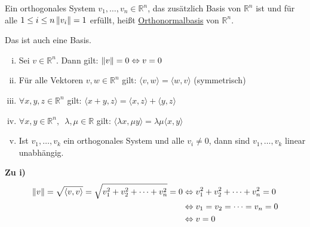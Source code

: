 Ein orthogonales System $v_1,\dots,v_n \in \mathbb{R}^n$, das zusätzlich Basis von $\mathbb{R}^n$ ist und für alle $1\leq i\leq n \left\lVert v_i\right\rVert = 1$ erfüllt, heißt \underline{Orthonormalbasis} von $\mathbb{R}^n$.

\begin{center}
\end{center}
Das ist auch eine Basis.

\begin{enumerate}[i)]
  \item{Sei $v \in \mathbb{R}^n$. Dann gilt: $\left\lVert v\right\rVert = 0 \Leftrightarrow v = 0$}
  \item{Für alle Vektoren $v, w \in \mathbb{R}^n$ gilt: $\langle v, w\rangle = \langle w, v\rangle$ (\glqq{}symmetrisch\grqq{})}
  \item{$\forall x, y, z \in \mathbb{R}^n$ gilt: $\langle x+y, z\rangle = \langle x, z\rangle + \langle y, z\rangle$}
  \item{$\forall x, y \in \mathbb{R}^n,\enspace \lambda, \mu \in \mathbb{R}$ gilt: $\langle\lambda x, \mu y\rangle = \lambda\mu\langle x, y\rangle$}
  \item{Ist $v_1,\dots,v_k$ ein orthogonales System und alle $v_i \neq 0$, dann sind $v_1,\dots,v_k$ linear unabhängig.}
\end{enumerate}

\textbf{Zu i)}
\begin{align*}
	\left\lVert v\right\rVert = \sqrt{\langle v, v\rangle} = \sqrt{v_1^2+v_2^2+\dots +v_n^2} = 0 &\Leftrightarrow v_1^2+v_2^2+\dots +v_n^2 = 0 \\
	&\Leftrightarrow v_1 = v_2 = \dots = v_n = 0 \\
	&\Leftrightarrow v = 0
\end{align*}

